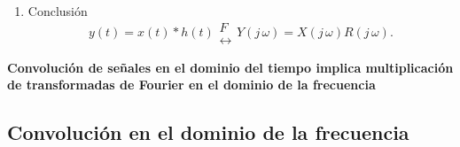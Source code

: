 \begin{enumerate}
\item Conclusi\'{o}n 
\begin{equation}
y\left( t\right) =x\left( t\right) * h\left( t\right) 
        \begin{array}{l}
                F \\ 
                \leftrightarrow
        \end{array}
        Y\left( j \, \omega \right) = X\left( j \, \omega \right) R\left( j \, \omega \right) .
\end{equation}

\end{enumerate}

\textbf{Convoluci\'{o}n de se\~{n}ales en el dominio del tiempo implica multiplicaci\'{o}n de 
transformadas de Fourier en el dominio de la frecuencia}

\subsection{Convolución en el dominio de la frecuencia}

